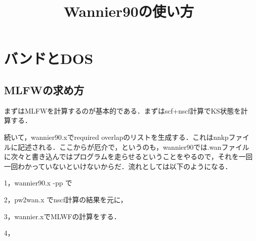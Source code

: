 \documentclass[a4j]{jarticle}
\title{Wannier90の使い方}
\begin{document}
\section{バンドとDOS}
\subsection{MLFWの求め方}
まずはMLFWを計算するのが基本的である．まずはscf+nscf計算でKS状態を計算する．


続いて，wannier90.xでrequired overlapのリストを生成する．これはnnkpファイルに記述される．ここからが厄介で，というのも，wannier90では.wanファイルに次々と書き込んではプログラムを走らせるということをやるので，それを一回一回わかっていないといけないからだ．流れとしては以下のようになる．


1，wannier90.x -pp  で

2，pw2wan.x でnscf計算の結果を元に，

3，wannier.xでMLWFの計算をする．

4，
\end{document}
